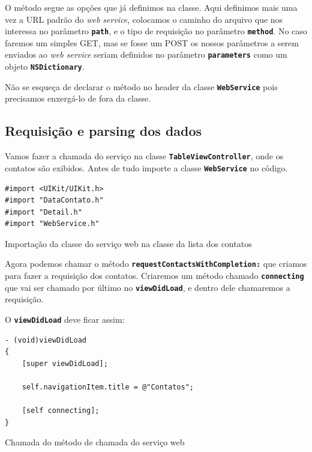 \documentclass[a4paper,12pt,brazil,oneside]{book}
\begin{document}
O método segue as opções que já definimos na classe. Aqui definimos mais uma vez a URL padrão do \emph{web service}, colocamos o caminho do arquivo que nos interessa no parâmetro \texttt{\textbf{path}}, e o tipo de requisição no parâmetro \texttt{\textbf{method}}. No caso faremos um simples GET, mas se fosse um POST os nossos parâmetros a serem enviados ao \emph{web service} seriam definidos no parâmetro \texttt{\textbf{parameters}} como um objeto  \texttt{\textbf{NSDictionary}}.

Não se esqueça de declarar o método no header da classe \texttt{\textbf{WebService}} pois precisamos enxergá-lo de fora da classe.

\subsection{Requisição e parsing dos dados}


Vamos fazer a chamada do serviço na classe \texttt{\textbf{TableViewController}}, onde os contatos são exibidos. Antes de tudo importe a classe \texttt{\textbf{WebService}} no código.

\begin{listing}[H]
\begin{verbatim}
#import <UIKit/UIKit.h>
#import "DataContato.h"
#import "Detail.h"
#import "WebService.h"
\end{verbatim}
\caption{Importação da classe do serviço web na classe da lista dos contatos}
\end{listing}


Agora podemos chamar o método \texttt{\textbf{requestContactsWithCompletion:}} que criamos para fazer a requisição dos contatos. Criaremos um método chamado \texttt{\textbf{connecting}} que vai ser chamado por último no \texttt{\textbf{viewDidLoad}}, e dentro dele chamaremos a requisição.

O \texttt{\textbf{viewDidLoad}} deve ficar assim:

\begin{listing}[H]
\begin{verbatim}
- (void)viewDidLoad
{
    [super viewDidLoad];

    self.navigationItem.title = @"Contatos";
    
    [self connecting];
}
\end{verbatim}
\caption{Chamada do método de chamada do serviço web}
\end{listing}
\end{document}

